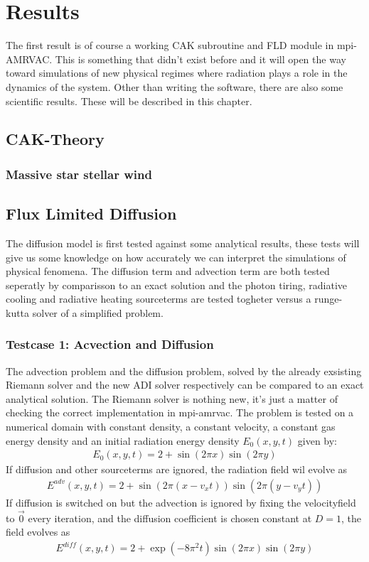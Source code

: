 \chapter{Results}
The first result is of course a working CAK subroutine and FLD module in mpi-AMRVAC. This is something that didn't exist before and it will open the way toward simulations of new physical regimes where radiation plays a role in the dynamics of the system. Other than writing the software, there are also some scientific results. These will be described in this chapter.

\section{CAK-Theory}
\subsection{Massive star stellar wind}

\section{Flux Limited Diffusion}
The diffusion model is first tested against some analytical results, these tests will give us some knowledge on how accurately we can interpret the simulations of physical fenomena. The diffusion term and advection term are both tested seperatly by comparisson to an exact solution and the photon tiring, radiative cooling and radiative heating sourceterms are tested togheter versus a runge-kutta solver of a simplified problem.

\subsection{Testcase 1: Acvection and Diffusion}
The advection problem and the diffusion problem, solved by the already exsisting Riemann solver and the new ADI solver respectively can be compared to an exact analytical solution. The Riemann solver is nothing new, it's just a matter of checking the correct implementation in mpi-amrvac. The problem is tested on a numerical domain with constant density, a constant velocity, a constant gas energy density and an initial radiation energy density $E_0(x,y,t)$ given by:
\begin{align}
E_0(x,y,t) = 2 + \sin(2 \pi x) \sin(2 \pi y)
\end{align}
If diffusion and other sourceterms are ignored, the radiation field wil evolve as
\begin{align}
E^{adv}(x,y,t) = 2 + \sin(2 \pi (x-v_x t)) \sin(2 \pi (y-v_y t))
\end{align}
If diffusion is switched on but the advection is ignored by fixing the velocityfield to $\vec{0}$ every iteration, and the diffusion coefficient is chosen constant at $D = 1$, the field evolves as
\begin{align}
E^{diff}(x,y,t) = 2 + \exp(-8 \pi^2 t) \sin(2 \pi x) \sin(2 \pi y)
\end{align}

